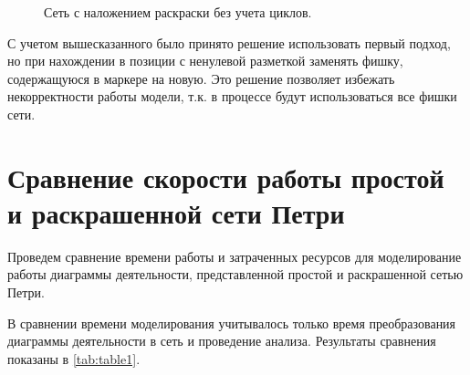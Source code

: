 \begin{figure}
\begin{minipage}[H]{0.49\linewidth}
		\caption{Сеть с наложением раскраски без учета циклов.}
		\label{fig:fig26}
	\end{minipage}
\end{figure}

С учетом вышесказанного было принято решение использовать первый подход, но при нахождении в позиции с ненулевой разметкой заменять фишку, содержащуюся в маркере на новую. Это решение позволяет избежать некорректности работы модели, т.к. в процессе будут использоваться все фишки сети.

\section{Сравнение скорости работы простой и раскрашенной сети Петри}

Проведем сравнение времени работы и затраченных ресурсов для моделирование работы диаграммы деятельности, представленной простой и раскрашенной сетью Петри.

В сравнении времени моделирования учитывалось только время преобразования диаграммы деятельности в сеть и проведение анализа. Результаты сравнения показаны в \ref{tab:table1}.


